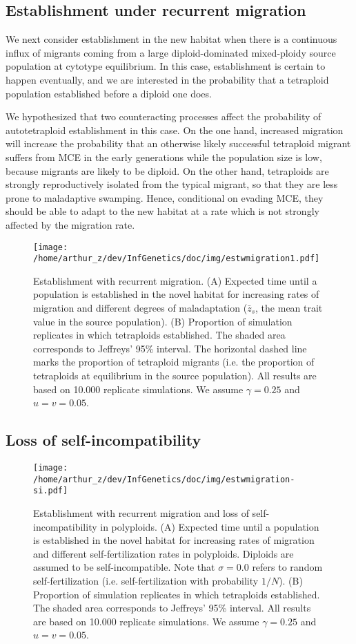 \documentclass[11pt,a4paper]{article}
\begin{document}
\subsection*{Establishment under recurrent migration}

We next consider establishment in the new habitat when there is a continuous
influx of migrants coming from a large diploid-dominated mixed-ploidy source
population at cytotype equilibrium.
In this case, establishment is certain to happen eventually, and we are
interested in the probability that a tetraploid population established before a
diploid one does.

We hypothesized that two counteracting processes affect the probability of
autotetraploid establishment in this case.
On the one hand, increased migration will increase the probability that an
otherwise likely successful tetraploid migrant suffers from MCE in the early
generations while the population size is low, because migrants are likely to be
diploid.
On the other hand, tetraploids are strongly reproductively isolated from
the typical migrant, so that they are less prone to maladaptive swamping.
Hence, conditional on evading MCE, they should be able to adapt to the new
habitat at a rate which is not strongly affected by the migration rate.

\begin{figure}[t]
\texttt{[image: /home/arthur\_z/dev/InfGenetics/doc/img/estwmigration1.pdf]}
\caption{
Establishment with recurrent migration.
(A) Expected time until a population is established in the novel habitat for
increasing rates of migration and different degrees of maladaptation
($\bar{z}_s$, the mean trait value in the source population). 
(B) Proportion of simulation replicates in which tetraploids established. 
The shaded area corresponds to Jeffreys' 95\% interval.
The horizontal dashed line marks the proportion of tetraploid migrants (i.e.
the proportion of tetraploids at equilibrium in the source population).
All results are based on 10.000 replicate simulations.
We assume $\gamma=0.25$ and $u=v=0.05$.
\label{fig:estwmig}}
\end{figure}

\subsection*{Loss of self-incompatibility}


\begin{figure}
\texttt{[image: /home/arthur\_z/dev/InfGenetics/doc/img/estwmigration-si.pdf]}
\caption{
Establishment with recurrent migration and loss of self-incompatibility in
polyploids.
(A) Expected time until a population is established in the novel habitat for
increasing rates of migration and different self-fertilization rates in
polyploids. Diploids are assumed to be self-incompatible.
Note that $\sigma=0.0$ refers to random self-fertilization (i.e.
self-fertilization with probability $1/N$). 
(B) Proportion of simulation replicates in which tetraploids established. 
The shaded area corresponds to Jeffreys' 95\% interval.
All results are based on 10.000 replicate simulations.
We assume $\gamma=0.25$ and $u=v=0.05$.
\label{fig:}}
\end{figure}
\end{document}

